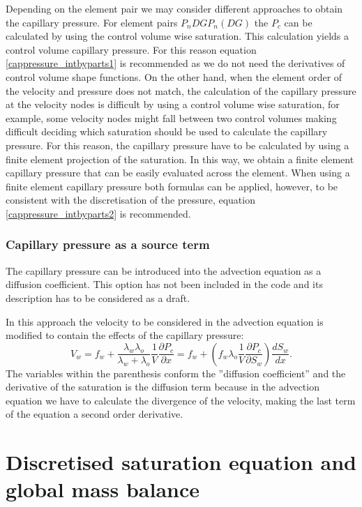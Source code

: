 Depending on the element pair we may consider different approaches to obtain the capillary pressure. For element pairs $P_nDGP_n(DG) $ the $P_c$ can be calculated by using the control volume wise saturation. This calculation yields a control volume capillary pressure. For this reason equation \ref{cappressure_intbyparts1} is recommended as we do not need the derivatives of control volume shape functions. 
On the other hand, when the element order of the velocity and pressure does not match, the calculation of the capillary pressure at the velocity nodes is difficult by using a control volume wise saturation, for example, some velocity nodes might fall between two control volumes making difficult deciding which saturation should be used to calculate the capillary pressure. For this reason, the capillary pressure have to be calculated by using a finite element projection of the saturation. In this way, we obtain a finite element capillary pressure that can be easily evaluated across the element. When using a finite element capillary pressure both formulas can be applied, however, to be consistent with the discretisation of the pressure, equation \ref{cappressure_intbyparts2} is recommended.

\subsubsection*{Capillary pressure as a source term}

The capillary pressure can be introduced into the advection equation as a diffusion coefficient. This option has not been included in the code and its description has to be considered as a draft.

In this approach the velocity to be considered in the advection equation is modified to contain the effects of the capillary pressure:
\begin{equation}
V_w = f_w + \frac{\lambda_w\lambda_o}{\lambda_w+\lambda_o} \frac{1}{V} \frac{\partial P_c}{\partial x} = f_w + \left(  f_w \lambda_o \frac{1}{V} \frac{\partial P_c}{\partial S_w} \right) \frac{d S_w}{d x}.
\end{equation}
The variables within the parenthesis conform the ''diffusion coefficient'' and the derivative of the saturation is the diffusion term because in the advection equation we have to calculate the divergence of the velocity, making the last term of the equation a second order derivative.

\section{Discretised saturation equation and global mass balance} 

